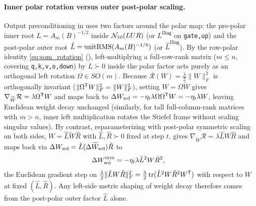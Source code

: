 \paragraph{Inner polar rotation versus outer post-polar scaling.}
Output preconditioning in  uses two factors around the polar map: the pre-polar inner root $L=A_m(B)^{-1/2}$ inside $\mathcal{N}_{10}(LUR)$ (or $L^{\mathsf{Diag}}$ on \texttt{gate,up}) and the post-polar outer root $\hat L=\operatorname{unitRMS}(A_m(B)^{-1/8})$ (or $\hat L^{\mathsf{Diag}}$). By the row-polar identity \cref{eq:som_rotation} (), left-multiplying a full-row-rank matrix ($m\le n$, covering \texttt{q,k,v,o,down}) by $L\succ0$ inside the polar factor acts purely as an orthogonal left rotation $\Omega\in SO(m)$. Because $\mathcal R(W)=\frac{\lambda}{2}\|W\|_F^2$ is orthogonally invariant ($\|\Omega^{{\mathsf{T}}}W\|_F^2=\|W\|_F^2$), setting $W=\Omega\widetilde W$ gives $\nabla_{\widetilde W}\mathcal R=\lambda\Omega^{{\mathsf{T}}}W$ and maps back to $\Delta W_{\rm wd}=-\eta_t\lambda\Omega\Omega^{{\mathsf{T}}}W=-\eta_t\lambda W$, leaving Euclidean weight decay unchanged (similarly, for tall full-column-rank matrices with $m>n$, inner left multiplication rotates the Stiefel frame without scaling singular values). By contrast, reparameterizing with post-polar symmetric scaling on both sides, $W=\hat L\widetilde W\hat R$ with $\hat L,\hat R\succ0$ fixed at step $t$, gives $\nabla_{\widetilde W}\mathcal R=\lambda\hat L W\hat R$ and maps back via $\Delta W_{\rm wd}=\hat L(\Delta\widetilde W_{\rm wd})\hat R$ to
\[
 \Delta W_{\rm wd}^{\rm sym}=-\eta_t\lambda\hat L^2 W\hat R^2,
\]
the Euclidean gradient step on $\frac{\lambda}{2}\|\hat L W\hat R\|_F^2=\frac{\lambda}{2}\operatorname{tr}(\hat L^2 W\hat R^2 W^{{\mathsf{T}}})$ with respect to $W$ at fixed $(\hat L,\hat R)$. Any left-side metric shaping of weight decay therefore comes from the post-polar outer factor $\hat L$ alone.

